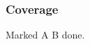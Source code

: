 \documentclass{ltx-talk}
\begin{document}
\begin{frame}
\frametitle{Coverage}
Marked A  B done.
\end{frame}
\end{document}

